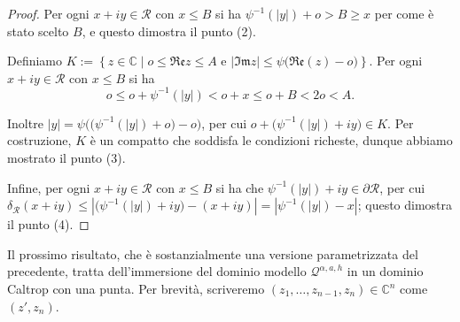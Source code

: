 \begin{proof}
    Per ogni $x+iy\in\mathcal{R}$ con $x\le B$ si ha $\psi^{-1}(|y|)+o>B \ge x$ per come è stato scelto $B$, e questo dimostra il punto (2).

    Definiamo $K:=\left\{z\in\mathbb{C}\mid o \le \mathfrak{Re}z\le A\text{ e }|\mathfrak{Im}z| \le \psi\big(\mathfrak{Re}(z)-o\big)\right\}$. Per ogni $x+iy\in\mathcal{R}$ con $x\le B$ si ha
    $$o \le o+\psi^{-1}(|y|) <o+x \le o+B<2o<A.$$

    Inoltre $|y|=\psi\Big(\big(\psi^{-1}(|y|)+o\big)-o\Big)$, per cui $o+\big(\psi^{-1}(|y|)+iy\big)\in K$. Per costruzione, $K$ è un compatto che soddisfa le condizioni richeste, dunque abbiamo mostrato il punto (3).

    Infine, per ogni $x+iy\in\mathcal{R}$ con $x\le B$ si ha che $\psi^{-1}(|y|)+iy\in\partial\mathcal{R}$, per cui $\delta_{\mathcal{R}}(x+iy) \le \left|\big(\psi^{-1}(|y|)+iy\big)-(x+iy)\right|=|\psi^{-1}(|y|)-x|$; questo dimostra il punto (4).
\end{proof}

Il prossimo risultato, che è sostanzialmente una versione parametrizzata del precedente, tratta dell'immersione del dominio modello $\mathcal{Q}^{\alpha,a,h}$ in un dominio Caltrop con una punta. Per brevità, scriveremo $(z_1,\dots,z_{n-1},z_n)\in\mathbb{C}^n$ come $(z',z_n)$.

